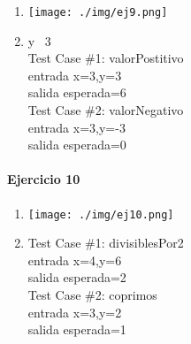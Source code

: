 \documentclass{article}
\begin{document}
\begin{multicols}{2}
\begin{enumerate}
\item \texttt{[image: ./img/ej9.png]}
\item	y  \ 3\\
Test Case \#1: valorPostitivo\\
\hspace*{6mm}entrada x=3,y=3\\
\hspace*{6mm}salida esperada=6\medskip\\
Test Case \#2: valorNegativo\\
\hspace*{6mm}entrada x=3,y=-3\\
\hspace*{6mm}salida esperada=0\medskip\\
\end{enumerate}
\end{multicols}

\paragraph{Ejercicio 10}

\begin{multicols}{2}
\begin{enumerate}
\item \texttt{[image: ./img/ej10.png]}
\item	
Test Case \#1: divisiblesPor2\\
\hspace*{6mm}entrada x=4,y=6\\
\hspace*{6mm}salida esperada=2\medskip\\
Test Case \#2: coprimos\\
\hspace*{6mm}entrada x=3,y=2\\
\hspace*{6mm}salida esperada=1\medskip\\
\end{enumerate}
\end{multicols}
\end{document}
